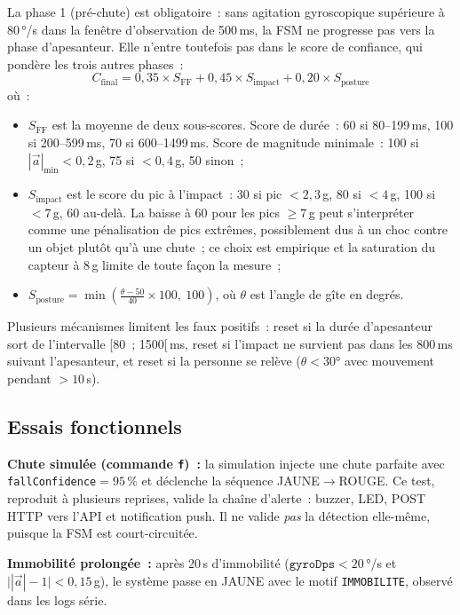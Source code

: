 \documentclass[12pt,a4paper]{article}
\renewcommand{\_}{\textunderscore\allowbreak}
\begin{document}
La phase 1 (pré-chute) est obligatoire~: sans agitation gyroscopique supérieure à 80\,°/s dans la fenêtre d'observation de 500\,ms, la FSM ne progresse pas vers la phase d'apesanteur. Elle n'entre toutefois pas dans le score de confiance, qui pondère les trois autres phases~:
\begin{equation}
    C_{\text{final}} = 0{,}35 \times S_{\text{FF}} + 0{,}45 \times S_{\text{impact}} + 0{,}20 \times S_{\text{posture}}
    \label{eq:confidence}
\end{equation}
où~:
\begin{itemize}
    \item $S_{\text{FF}}$ est la moyenne de deux sous-scores. Score de durée~: 60 si 80--199\,ms, 100 si 200--599\,ms, 70 si 600--1499\,ms. Score de magnitude minimale~: 100 si $|\vec{a}|_{\min}<0{,}2$\,g, 75 si $<0{,}4$\,g, 50 sinon~;
    \item $S_{\text{impact}}$ est le score du pic à l'impact~: 30 si pic $<2{,}3$\,g, 80 si $<4$\,g, 100 si $<7$\,g, 60 au-delà. La baisse à 60 pour les pics $\geq 7$\,g peut s'interpréter comme une pénalisation de pics extrêmes, possiblement dus à un choc contre un objet plutôt qu'à une chute~; ce choix est empirique et la saturation du capteur à 8\,g limite de toute façon la mesure~;
    \item $S_{\text{posture}} = \min\!\left(\frac{\theta - 50}{40} \times 100,\ 100\right)$, où $\theta$ est l'angle de gîte en degrés.
\end{itemize}

Plusieurs mécanismes limitent les faux positifs~: reset si la durée d'apesanteur sort de l'intervalle [80~; 1500[\,ms, reset si l'impact ne survient pas dans les 800\,ms suivant l'apesanteur, et reset si la personne se relève ($\theta<30$° avec mouvement pendant $>10$\,s).



\subsection{Essais fonctionnels}

\textbf{Chute simulée (commande \texttt{f})~:} la simulation injecte une chute parfaite avec \texttt{fallConfidence}$=95\,\%$ et déclenche la séquence JAUNE$\rightarrow$ROUGE. Ce test, reproduit à plusieurs reprises, valide la chaîne d'alerte~: buzzer, LED, POST HTTP vers l'API et notification push. Il ne valide \emph{pas} la détection elle-même, puisque la FSM est court-circuitée.

\textbf{Immobilité prolongée~:} après 20\,s d'immobilité ($\texttt{gyroDps}<20$\,°/s et $\bigl||\vec{a}|-1\bigr|<0{,}15$\,g), le système passe en JAUNE avec le motif \texttt{IMMOBILITE}, observé dans les logs série.
\end{document}
